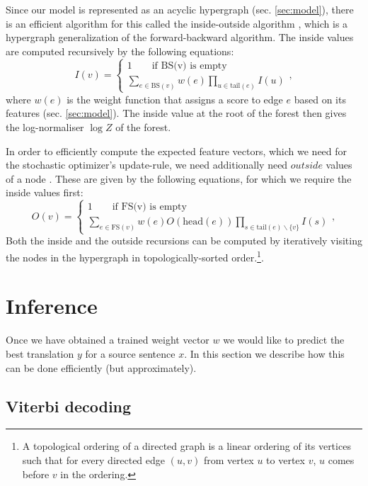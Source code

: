 \documentclass[11pt,a4paper]{article}
\begin{document}
Since our model is represented as an acyclic hypergraph (sec. \ref{sec:model}), there is an efficient algorithm for this called the inside-outside algorithm \cite{Lari90}, which is a hypergraph generalization of the forward-backward algorithm. The inside values are computed recursively by the following equations:
\begin{equation*}
    I(v) = \begin{cases}
        1 \qquad\text{if BS(v) is empty} \\
        \sum\limits_{e \in \textrm{BS}(v)} w(e) \prod\limits_{u \in \textrm{tail}(e)} I(u)
    \end{cases},
\end{equation*}
where $w(e)$ is the weight function that assigns a score to edge $e$ based on its features (sec. \ref{sec:model}). The inside value at the root of the forest then gives the log-normaliser $\log Z$ of the forest.

In order to efficiently compute the expected feature vectors, which we need for the stochastic optimizer's update-rule, we need additionally need $outside$ values of a node \cite{Li09}. These are given by the following equations, for which we require the inside values first:
\begin{equation*}
    O(v) = \begin{cases}
        1 \qquad\text{if FS(v) is empty} \\
        \sum\limits_{e \in \textrm{FS}(v)} w(e) O(\textrm{head}(e)) \prod\limits_{s \in \textrm{tail}(e) \backslash \{ v \}} I(s)
    \end{cases},
\end{equation*}
Both the inside and the outside recursions can be computed by iteratively visiting the nodes in the hypergraph in topologically-sorted order.\footnote{ A topological ordering of a directed graph is a linear ordering of its vertices such that for every directed edge $(u,v)$ from vertex $u$ to vertex $v$, $u$ comes before $v$ in the ordering.}.

\section{Inference}
Once we have obtained a trained weight vector $w$ we would like to predict the best translation $y$ for a source sentence $x$. In this section we describe how this can be done efficiently (but approximately).

\subsection{Viterbi decoding}
\end{document}
